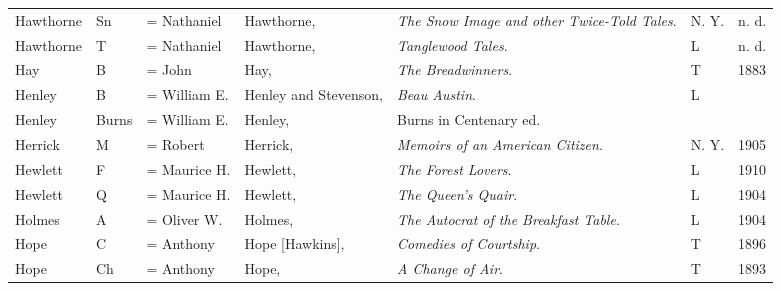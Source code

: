 \begin{sidewaystable}
\begin{tabular}{p{} p{} p{} p{} p{} p{} p{}}
Hawthorne& Sn & = Nathaniel & Hawthorne, & \textit{The Snow Image and other Twice-Told Tales}. & N. Y. & n. d. \\
Hawthorne& T & = Nathaniel & Hawthorne, & \textit{Tanglewood Tales}. & L & n. d. \\
Hay & B & = John & Hay, & \textit{The Breadwinners}. & T & 1883 \\
Henley & B & = William E. & Henley and Stevenson, & \textit{Beau Austin}. & L & \\
Henley& Burns & = William E. & Henley, & Burns in Centenary ed. & & \\
Herrick & M & = Robert & Herrick, & \textit{Memoirs of an American Citizen}. & N. Y. & 1905 \\
Hewlett & F & = Maurice H. & Hewlett, & \textit{The Forest Lovers}. & L & 1910 \\
Hewlett& Q & = Maurice H. & Hewlett, & \textit{The Queen's Quair}. & L & 1904 \\
Holmes & A & = Oliver W. & Holmes, & \textit{The Autocrat of the Breakfast Table}. & L & 1904 \\
Hope & C & = Anthony & Hope [Hawkins], & \textit{Comedies of Courtship}. & T & 1896 \\
Hope& Ch & = Anthony & Hope, & \textit{A Change of Air}. & T & 1893 \\
\end{tabular}
\end{sidewaystable}

